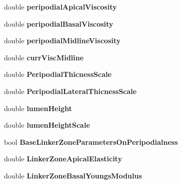 \begin{DoxyCompactItemize}
\item 
\hypertarget{classSimulation_a9d12531ec1daffb9e389ac59b4f43299}{}double {\bfseries peripodial\+Apical\+Viscosity}\label{classSimulation_a9d12531ec1daffb9e389ac59b4f43299}

\item 
\hypertarget{classSimulation_aa37b9f5ae1a1711bf6905ea1525fb1f4}{}double {\bfseries peripodial\+Basal\+Viscosity}\label{classSimulation_aa37b9f5ae1a1711bf6905ea1525fb1f4}

\item 
\hypertarget{classSimulation_a92b5bdeb108bfc8816cd90eddbe49067}{}double {\bfseries peripodial\+Midline\+Viscosity}\label{classSimulation_a92b5bdeb108bfc8816cd90eddbe49067}

\item 
\hypertarget{classSimulation_adb5528b3e1aa56936966b9ebeb88ecf5}{}double {\bfseries curr\+Visc\+Midline}\label{classSimulation_adb5528b3e1aa56936966b9ebeb88ecf5}

\item 
\hypertarget{classSimulation_a1b5fd33e66ce33ae07ba854785735162}{}double {\bfseries Peripodial\+Thicness\+Scale}\label{classSimulation_a1b5fd33e66ce33ae07ba854785735162}

\item 
\hypertarget{classSimulation_a1614132f37b02b184661370a188d9b74}{}double {\bfseries Peripodial\+Lateral\+Thicness\+Scale}\label{classSimulation_a1614132f37b02b184661370a188d9b74}

\item 
\hypertarget{classSimulation_a661531b9180d4b893f4f0221fe518b7b}{}double {\bfseries lumen\+Height}\label{classSimulation_a661531b9180d4b893f4f0221fe518b7b}

\item 
\hypertarget{classSimulation_a1a4bdb2cb7810665b95bd884dfa19adc}{}double {\bfseries lumen\+Height\+Scale}\label{classSimulation_a1a4bdb2cb7810665b95bd884dfa19adc}

\item 
\hypertarget{classSimulation_a7c6f3faf5d16e41aa43c9a71fb67d1b8}{}bool {\bfseries Base\+Linker\+Zone\+Parameters\+On\+Peripodialness}\label{classSimulation_a7c6f3faf5d16e41aa43c9a71fb67d1b8}

\item 
\hypertarget{classSimulation_aaa5d205910274dd5be4976b87ab20abc}{}double {\bfseries Linker\+Zone\+Apical\+Elasticity}\label{classSimulation_aaa5d205910274dd5be4976b87ab20abc}

\item 
\hypertarget{classSimulation_a07cf19fd8a3e78d4644563b3c9c030ee}{}double {\bfseries Linker\+Zone\+Basal\+Youngs\+Modulus}\label{classSimulation_a07cf19fd8a3e78d4644563b3c9c030ee}


\end{DoxyCompactItemize}
